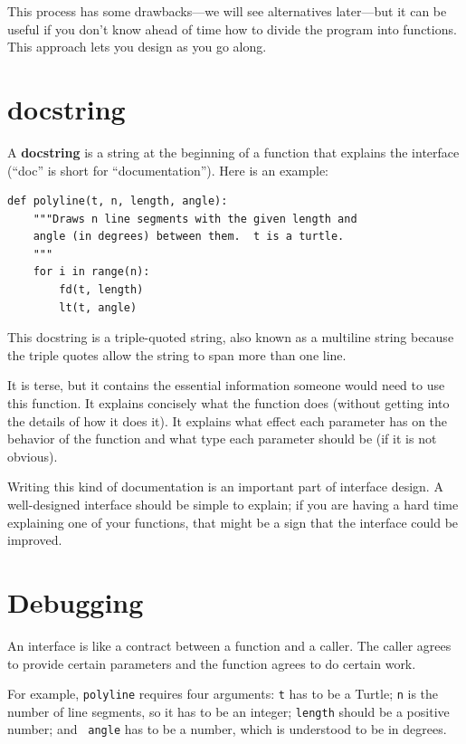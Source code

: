 \documentclass[10pt]{book}
\begin{document}
This process has some drawbacks---we will see alternatives later---but
it can be useful if you don't know ahead of time how to divide the
program into functions.  This approach lets you design as you go
along.


\section{docstring}
\label{docstring}

A {\bf docstring} is a string at the beginning of a function that
explains the interface (``doc'' is short for ``documentation'').  Here
is an example:

\begin{verbatim}
def polyline(t, n, length, angle):
    """Draws n line segments with the given length and
    angle (in degrees) between them.  t is a turtle.
    """    
    for i in range(n):
        fd(t, length)
        lt(t, angle)
\end{verbatim}
%
This docstring is a triple-quoted string, also known
as a multiline string because the triple quotes allow the string
to span more than one line.

It is terse, but it contains the essential information
someone would need to use this function.  It explains concisely what
the function does (without getting into the details of how it does
it).  It explains what effect each parameter has on the behavior of
the function and what type each parameter should be (if it is not
obvious).

Writing this kind of documentation is an important part of interface
design.  A well-designed interface should be simple to explain;
if you are having a hard time explaining one of your functions,
that might be a sign that the interface could be improved.


\section{Debugging}

An interface is like a contract between a function and a caller.
The caller agrees to provide certain parameters and the function
agrees to do certain work.

For example, {\tt polyline} requires four arguments: {\tt t} has to be
a Turtle; {\tt n} is the number of line segments, so it has to be an
integer; {\tt length} should be a positive number; and {\tt
  angle} has to be a number, which is understood to be in degrees.
\end{document}
